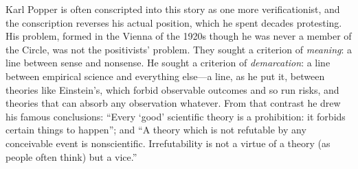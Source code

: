 Karl Popper is often conscripted into this story as one more verificationist, and the conscription reverses his actual position, which he spent decades protesting. His problem, formed in the Vienna of the 1920s though he was never a member of the Circle, was not the positivists' problem. They sought a criterion of \emph{meaning}: a line between sense and nonsense. He sought a criterion of \emph{demarcation}: a line between empirical science and everything else---a line, as he put it, between theories like Einstein's, which forbid observable outcomes and so run risks, and theories that can absorb any observation whatever. From that contrast he drew his famous conclusions: ``Every `good' scientific theory is a prohibition: it forbids certain things to happen''; and ``A theory which is not refutable by any conceivable event is nonscientific. Irrefutability is not a virtue of a theory (as people often think) but a vice.''

